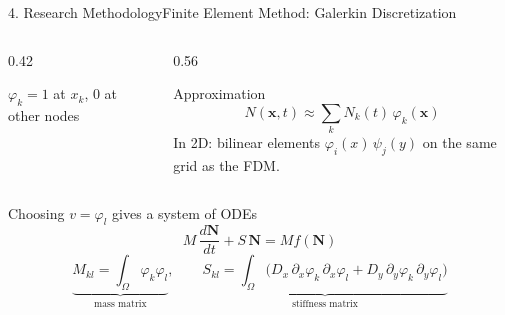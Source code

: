 \documentclass[10pt]{beamer}
\begin{document}
    \begin{frame}{4. Research Methodology}{Finite Element Method: Galerkin Discretization}
      \begin{columns}[c]
        \begin{column}{0.42\textwidth}
          \begin{center}

            {\scriptsize $\varphi_k = 1$ at $x_k$, $0$ at other nodes}
          \end{center}
        \end{column}
        \begin{column}{0.56\textwidth}
          \begin{block}{Approximation}
              $$
              N(\mathbf{x},t) \approx \sum_k N_k(t)\, \varphi_k(\mathbf{x})
              $$
              In 2D: bilinear elements $\varphi_i(x)\,\psi_j(y)$ on the same grid as the FDM.
          \end{block}
        \end{column}
      \end{columns}
      \begin{block}{Choosing $v = \varphi_l$ gives a system of ODEs}
          $$
          M\,\frac{d\mathbf{N}}{dt} + S\,\mathbf{N} = M f(\mathbf{N})
          $$
          $$
          \underbrace{M_{kl} = \int_\Omega \varphi_k\varphi_l}_{\text{mass matrix}},
          \qquad
          \underbrace{S_{kl} = \int_\Omega \big(D_x\, \partial_x\varphi_k\, \partial_x\varphi_l + D_y\, \partial_y\varphi_k\, \partial_y\varphi_l\big)}_{\text{stiffness matrix}}
          $$
      \end{block}
    \end{frame}
\end{document}
